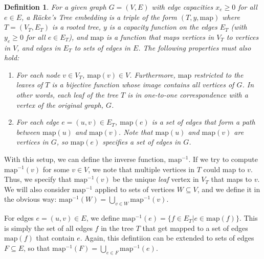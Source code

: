 \documentclass[12pt]{article}
\newtheorem{definition}{Definition}
\begin{document}
\begin{definition}
For a given graph $G = (V, E)$ with edge capacities $x_e \geq 0$ for all $e \in E$, a R\"{a}cke's Tree embedding is a triple of the form $(T,y,\mathrm{map})$ where $T = (V_T,E_T)$ is a rooted tree, $y$ is a capacity function on the edges $E_T$ (with $y_e \geq 0$ for all $e \in E_T$), and $\mathrm{map}$ is a function that maps vertices in $V_T$ to vertices in $V$, and edges in $E_T$ to sets of edges in $E$. The following properties must also hold:
\begin{enumerate}
\item For each node $v \in V_T$, $\mathrm{map}(v) \in V$. Furthermore, $\mathrm{map}$ restricted to the leaves of $T$ is a bijective function whose image contains all vertices of $G$. In other words, each leaf of the tree $T$ is in one-to-one correspondence with a vertex of the original graph, $G$.
\item For each edge $e = (u,v) \in E_T$, $\mathrm{map}(e)$ is a set of edges that form a path between $\mathrm{map}(u)$ and $\mathrm{map}(v)$. Note that $\mathrm{map}(u)$ and $\mathrm{map}(v)$ are vertices in $G$, so $\mathrm{map}(e)$ specifies a set of edges in $G$.
\end{enumerate}
\end{definition}

With this setup, we can define the inverse function, $\mathrm{map}^{-1}$. If we try to compute $\mathrm{map}^{-1}(v)$ for some $v \in V$, we note that multiple vertices in $T$ could map to $v$. Thus, we specify that $\mathrm{map}^{-1}(v)$ be the unique \emph{leaf} vertex in $V_T$ that maps to $v$. We will also consider $\mathrm{map}^{-1}$ applied to sets of vertices $W \subseteq V$, and we define it in the obvious way: $\mathrm{map}^{-1}(W) = \bigcup_{v \in W} \mathrm{map}^{-1}(v)$.

For edges $e = (u,v) \in E$, we define $\mathrm{map}^{-1}(e) = \{ f \in E_T | e \in \mathrm{map}(f)\}$. This is simply the set of all edges $f$ in the tree $T$ that get mapped to a set of edges $\mathrm{map}(f)$ that contain $e$. Again, this defintiion can be extended to sets of edges $F \subseteq E$, so that $\mathrm{map}^{-1}(F) = \bigcup_{e \in F} \mathrm{map}^{-1}(e)$.
\end{document}
